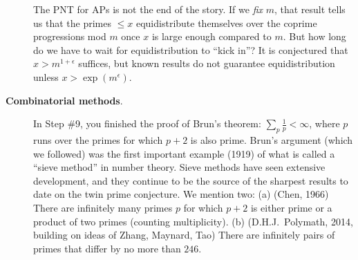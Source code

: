 \begin{description}
The PNT for APs is not the end of the story. If we \emph{fix} $m$, that result tells us that the primes $\le x$ equidistribute themselves over the coprime progressions mod $m$ once $x$ is large enough compared to $m$. But how long do we have to wait for  equidistribution to ``kick in''? It is conjectured that $x > m^{1+\epsilon}$ suffices, but known results do not guarantee equidistribution unless $x > \exp(m^{\epsilon})$.\bigskip

\item[{\textbf{Combinatorial methods}}.] In Step \#9, you finished the proof of Brun's theorem: $\sum_{p} \frac{1}{p} < \infty$, where $p$ runs over the primes for which $p+2$ is also prime. Brun's argument (which we followed) was the first important example (1919) of what is called a ``\textsf{sieve method}'' in number theory. Sieve methods have seen extensive development, and they continue to be the source of the sharpest results to date on the twin prime conjecture. We mention two: (a) (Chen, 1966) There are infinitely many primes $p$ for which $p+2$ is either prime or a product of two primes (counting multiplicity). (b) (D.H.J.\ Polymath, 2014, building on ideas of Zhang, Maynard, Tao) There are infinitely pairs of primes that differ by no more than $246$.
\end{description}

